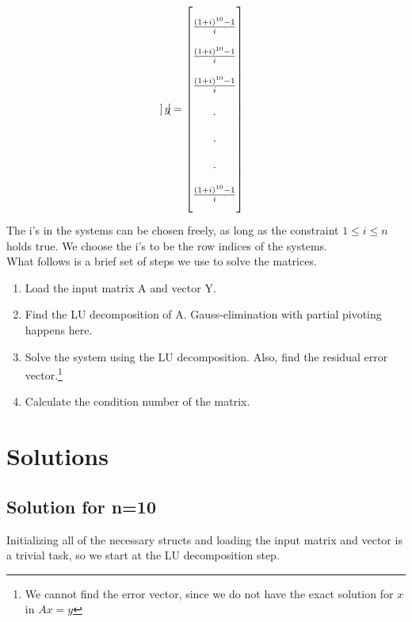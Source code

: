 \[\begin{bmatrix}
        \end{bmatrix}
        \\
        y =
        \begin{bmatrix}
            \\
            \frac{(1+i)^{10} - 1}{i} \\\\
            \frac{(1+i)^{10} - 1}{i} \\\\
            \frac{(1+i)^{10} - 1}{i} \\\\
            . \\\\
            . \\\\
            . \\\\
            \frac{(1+i)^{10} - 1}{i} \\\\
        \end{bmatrix}
    \]
    The i's in the systems can be chosen freely, as long as the constraint \( 1 \le i \le n \) holds true.
    We choose the i's to be the row indices of the systems. \\
    What follows is a brief set of steps we use to solve the matrices.
    \begin{enumerate}
        \item Load the input matrix A and vector Y.
        \item Find the LU decomposition of A.
                    \subitem Gauss-elimination with partial pivoting happens here.
        \item Solve the system using the LU decomposition.
            \subitem Also, find the residual error vector.\footnote{We cannot find the error vector, since we do not have the exact solution for \(x\) in \(Ax = y\)}
        \item Calculate the condition number of the matrix.
    \end{enumerate}
    
\newpage
\section{Solutions}
\label{sec:solutions}
    \subsection{Solution for n=10}
        Initializing all of the necessary structs and loading the input matrix and vector
        is a trivial task, so we start at the LU decomposition step.
